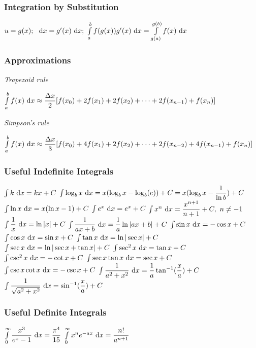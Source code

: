 \subsubsection{Integration by Substitution}
\begin{itemize}
\itemt \( u = g(x);\ \dn x = g'(x) \dn x;\ \int\limits_a^b f(g(x))g'(x) \dn x = \int\limits_{g(a)}^{g(b)} f(x) \dn x\)
\end{itemize}

\subsubsection{Approximations}
\textit{Trapezoid rule}
\begin{itemize}
\itemt \( \int\limits_a^b f(x) \ \mathrm{d}x \approx \dfrac{\Delta x}{2} [f(x_0) + 2f(x_1) + 2f(x_2) + \cdots + 2f(x_{n-1}) + f(x_n)] \)
\end{itemize}
\textit{Simpson's rule}
\begin{itemize}
\itemt \( \int\limits_a^b f(x) \ \mathrm{d}x \approx \dfrac{\Delta x}{3} [f(x_0) + 4f(x_1) + 2f(x_2) + \cdots + 2f(x_{n-2}) + 4f(x_{n-1}) + f(x_n)] \)
\end{itemize}

\subsubsection{Useful Indefinite Integrals}
\begin{itemize}
\itemt \( \int k \ \mathrm{d}x = kx + C \)
\itemt \( \int \log_bx \ \mathrm{d}x = x(\log_bx - \log_b(e)) + C = x(\log_bx - \dfrac{1}{\ln{b}}) + C \)
\itemt \( \int \ln x \ \mathrm{d}x = x(\ln x-1) + C \)
\itemt \( \int e^x \ \mathrm{d}x = e^x + C \)
\itemt \( \int x^n \ \mathrm{d}x = \dfrac{x^{n+1}}{n+1} + C,\ n \neq -1 \)
\itemt \( \int \dfrac{1}{x} \ \mathrm{d}x = \ln |x| + C \)
\itemt \( \int \dfrac{1}{ax+b} \ \mathrm{d}x = \dfrac{1}{a}\ln |ax+b| + C \)
\itemt \( \int \sin x \ \mathrm{d}x = -\cos x + C \)
\itemt \( \int \cos x \ \mathrm{d}x = \sin x + C \)
\itemt \( \int \tan x \ \mathrm{d}x = \ln |\sec x| + C \)
\itemt \( \int \sec x \ \mathrm{d}x = \ln |\sec x + \tan x| + C \)
\itemt \( \int \sec^2 x \ \mathrm{d}x = \tan x + C \)
\itemt \( \int \csc^2 x \ \mathrm{d}x = -\cot x + C \)
\itemt \( \int \sec x \tan x \ \mathrm{d}x = \sec x + C \)
\itemt \( \int \csc x \cot x \ \mathrm{d}x = -\csc x + C \)
\itemt \( \int \dfrac{1}{a^2 + x^2} \ \mathrm{d}x = \dfrac{1}{a} \tan^{-1}(\dfrac{x}{a}) +C \)
\itemt \( \int \dfrac{1}{\sqrt{a^2 + x^2}} \ \mathrm{d}x = \sin^{-1}(\dfrac{x}{a}) +C \)
\end{itemize}

\subsubsection{Useful Definite Integrals}
\begin{itemize}
\itemt \( \int\limits^\infty_0 \dfrac{x^3}{e^x -1} \ \mathrm{d}x = \dfrac{\pi^4}{15} \)
\itemt \( \int\limits^\infty_0 x^n e^{-ax} \ \mathrm{d}x = \dfrac{n!}{a^{n+1}} \)
\end{itemize}

